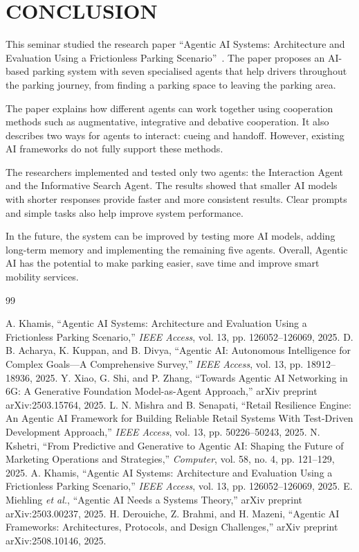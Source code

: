 \documentclass[12pt,a4paper]{report}
\begin{document}
\chapter{CONCLUSION}
This seminar studied the research paper ``Agentic AI Systems: Architecture and Evaluation Using a Frictionless Parking Scenario''~\cite{ref1}. The paper proposes an AI-based parking system with seven specialised agents that help drivers throughout the parking journey, from finding a parking space to leaving the parking area.

The paper explains how different agents can work together using cooperation methods such as augmentative, integrative and debative cooperation. It also describes two ways for agents to interact: cueing and handoff. However, existing AI frameworks do not fully support these methods.

The researchers implemented and tested only two agents: the Interaction Agent and the Informative Search Agent. The results showed that smaller AI models with shorter responses provide faster and more consistent results. Clear prompts and simple tasks also help improve system performance.

In the future, the system can be improved by testing more AI models, adding long-term memory and implementing the remaining five agents. Overall, Agentic AI has the potential to make parking easier, save time and improve smart mobility services.

\renewcommand{\bibname}{References}
\begin{singlespacing}
\begin{thebibliography}{99}
 A. Khamis, ``Agentic AI Systems: Architecture and Evaluation Using a Frictionless Parking Scenario,'' \emph{IEEE Access}, vol. 13, pp. 126052--126069, 2025.
 D. B. Acharya, K. Kuppan, and B. Divya, ``Agentic AI: Autonomous Intelligence for Complex Goals---A Comprehensive Survey,'' \emph{IEEE Access}, vol. 13, pp. 18912--18936, 2025.
 Y. Xiao, G. Shi, and P. Zhang, ``Towards Agentic AI Networking in 6G: A Generative Foundation Model-as-Agent Approach,'' arXiv preprint arXiv:2503.15764, 2025.
 L. N. Mishra and B. Senapati, ``Retail Resilience Engine: An Agentic AI Framework for Building Reliable Retail Systems With Test-Driven Development Approach,'' \emph{IEEE Access}, vol. 13, pp. 50226--50243, 2025.
 N. Kshetri, ``From Predictive and Generative to Agentic AI: Shaping the Future of Marketing Operations and Strategies,'' \emph{Computer}, vol. 58, no. 4, pp. 121--129, 2025.
 A. Khamis, ``Agentic AI Systems: Architecture and Evaluation Using a Frictionless Parking Scenario,'' \emph{IEEE Access}, vol. 13, pp. 126052--126069, 2025.
 E. Miehling \emph{et al.}, ``Agentic AI Needs a Systems Theory,'' arXiv preprint arXiv:2503.00237, 2025.
 H. Derouiche, Z. Brahmi, and H. Mazeni, ``Agentic AI Frameworks: Architectures, Protocols, and Design Challenges,'' arXiv preprint arXiv:2508.10146, 2025.
\end{thebibliography}
\end{singlespacing}
\end{document}
